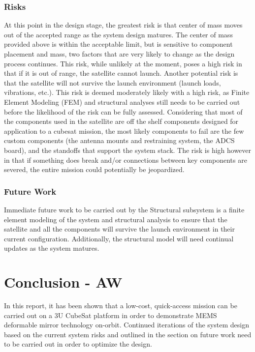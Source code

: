 \documentclass[12pt]{article}
\begin{document}
\subsubsection{Risks}
At this point in the design stage, the greatest risk is that center of mass moves out of the accepted range as the system design matures. The center of mass provided above is within the acceptable limit, but is sensitive to component placement and mass, two factors that are very likely to change as the design process continues. This risk, while unlikely at the moment, poses a high risk in that if it is out of range, the satellite cannot launch.
Another potential risk is that the satellite will not survive the launch environment (launch loads, vibrations, etc.). This risk is deemed moderately likely with a high risk, as Finite Element Modeling (FEM) and structural analyses still needs to be carried out before the likelihood of the risk can be fully assessed. Considering that most of the components used in the satellite are off the shelf components designed for application to a cubesat mission, the most likely components to fail are the few custom components (the antenna mounts and restraining system, the ADCS board), and the standoffs that support the system stack. The risk is high however in that if something does break and/or connections between key components are severed, the entire mission could potentially be jeopardized.

\subsubsection{Future Work}
Immediate future work to be carried out by the Structural subsystem is a finite element modeling of the system and structural analysis to ensure that the satellite and all the components will survive the launch environment in their current configuration. Additionally, the structural model will need continual updates as the system matures.

\section{Conclusion - AW}
In this report, it has been shown that a low-cost, quick-access mission can be carried out on a 3U CubeSat platform in order to demonstrate MEMS deformable mirror technology on-orbit.  Continued iterations of the system design based on the current system risks and outlined in the section on future work need to be carried out in order to optimize the design.
\end{document}
